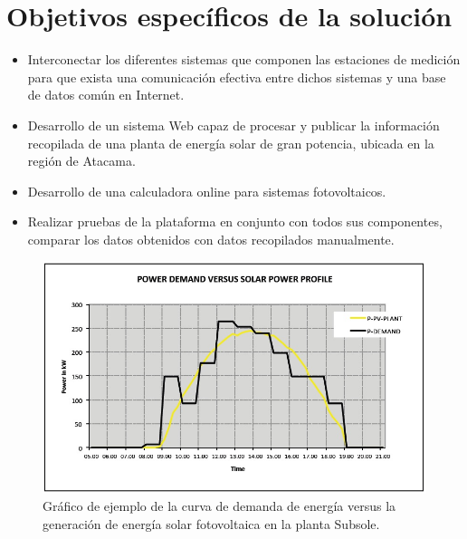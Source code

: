 \section{Objetivos específicos de la solución}
\begin{itemize}
\item Interconectar los diferentes sistemas que componen las estaciones de medición para que exista una comunicación efectiva entre dichos sistemas y una base de datos común en Internet.
\item Desarrollo de un sistema Web capaz de procesar y publicar la información recopilada de una planta de energía solar de gran potencia, ubicada en la región de Atacama.
\item Desarrollo de una calculadora online para sistemas fotovoltaicos.
\item Realizar pruebas de la plataforma en conjunto con todos sus componentes, comparar los datos obtenidos con datos recopilados manualmente.
\end{itemize}

\begin{figure}[h!]
        \centering
        \includegraphics[scale=0.8]{images/demandaGeneracionSubSole}
        \caption{Gráfico de ejemplo de la curva de demanda de energía versus la generación de energía solar fotovoltaica en la planta Subsole.}
\end{figure}

